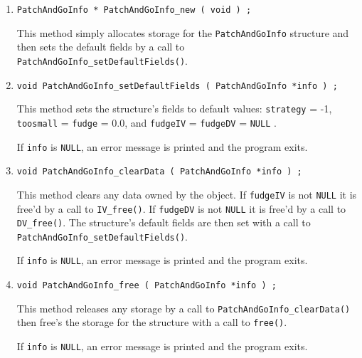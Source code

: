 \begin{enumerate}
\item
\begin{verbatim}
PatchAndGoInfo * PatchAndGoInfo_new ( void ) ;
\end{verbatim}
This method simply allocates storage for the {\tt PatchAndGoInfo} structure 
and then sets the default fields by a call to 
{\tt PatchAndGoInfo\_setDefaultFields()}.
\item
\begin{verbatim}
void PatchAndGoInfo_setDefaultFields ( PatchAndGoInfo *info ) ;
\end{verbatim}
This method sets the structure's fields to default values:
{\tt strategy} = -1, 
{\tt toosmall} = {\tt fudge} = 0.0,
and {\tt fudgeIV} = {\tt fudgeDV} = {\tt NULL} .
\par {}
If {\tt info} is {\tt NULL},
an error message is printed and the program exits.
\item
\begin{verbatim}
void PatchAndGoInfo_clearData ( PatchAndGoInfo *info ) ;
\end{verbatim}
This method clears any data owned by the object.
If {\tt fudgeIV} is not {\tt NULL} it is free'd
by a call to {\tt IV\_free()}.
If {\tt fudgeDV} is not {\tt NULL} it is free'd
by a call to {\tt DV\_free()}.
The structure's default fields are then set 
with a call to {\tt PatchAndGoInfo\_setDefaultFields()}.
\par {}
If {\tt info} is {\tt NULL},
an error message is printed and the program exits.
\item
\begin{verbatim}
void PatchAndGoInfo_free ( PatchAndGoInfo *info ) ;
\end{verbatim}
This method releases any storage by a call to 
{\tt PatchAndGoInfo\_clearData()} then free's the storage for the 
structure with a call to {\tt free()}.
\par {}
If {\tt info} is {\tt NULL},
an error message is printed and the program exits.
\end{enumerate}
\par
